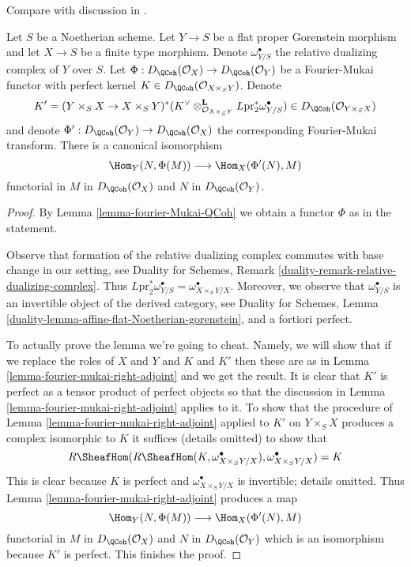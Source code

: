 \begin{lemma}
\label{lemma-fourier-mukai-left-adjoint}
\begin{reference}
Compare with discussion in \cite{Rizzardo}.
\end{reference}
Let $S$ be a Noetherian scheme. Let $Y \to S$ be a flat proper
Gorenstein morphism and let $X \to S$ be a finite type morphism.
Denote $\omega^\bullet_{Y/S}$ the relative dualizing complex of
$Y$ over $S$. Let $\Phi : D_\QCoh(\mathcal{O}_X) \to D_\QCoh(\mathcal{O}_Y)$
be a Fourier-Mukai functor with perfect kernel
$K \in D_\QCoh(\mathcal{O}_{X \times_S Y})$. Denote
$$
K' = (Y \times_S X \to X \times_S Y)^*(K^\vee
\otimes_{\mathcal{O}_{X \times_S Y}}^\mathbf{L}
L\text{pr}_2^*\omega^\bullet_{Y/S})
\in
D_\QCoh(\mathcal{O}_{Y \times_S X})
$$
and denote $\Phi' : D_\QCoh(\mathcal{O}_Y) \to D_\QCoh(\mathcal{O}_X)$
the corresponding Fourier-Mukai transform. There is a canonical
isomorphism
$$
\Hom_Y(N, \Phi(M)) \longrightarrow \Hom_X(\Phi'(N), M)
$$
functorial in $M$ in $D_\QCoh(\mathcal{O}_X)$ and $N$ in
$D_\QCoh(\mathcal{O}_Y)$.
\end{lemma}

\begin{proof}
By Lemma \ref{lemma-fourier-Mukai-QCoh} we obtain a functor $\Phi$
as in the statement.

\medskip\noindent
Observe that formation of the relative dualizing complex commutes
with base change in our setting, see Duality for Schemes,
Remark \ref{duality-remark-relative-dualizing-complex}.
Thus $L\text{pr}_2^*\omega^\bullet_{Y/S} = \omega^\bullet_{X \times_S Y/X}$.
Moreover, we observe that $\omega^\bullet_{Y/S}$ is an
invertible object of the derived category, see Duality for Schemes, Lemma
\ref{duality-lemma-affine-flat-Noetherian-gorenstein}, and a fortiori
perfect.

\medskip\noindent
To actually prove the lemma we're going to cheat. Namely, we will
show that if we replace the roles of $X$ and $Y$ and $K$ and $K'$
then these are as in Lemma \ref{lemma-fourier-mukai-right-adjoint}
and we get the result. It is clear that $K'$ is perfect as a
tensor product of perfect objects so that the discussion in
Lemma \ref{lemma-fourier-mukai-right-adjoint} applies to it.
To show that the procedure of
Lemma \ref{lemma-fourier-mukai-right-adjoint} applied to $K'$
on $Y \times_S X$ produces a complex isomorphic to $K$ it suffices
(details omitted) to show that
$$
R\SheafHom(R\SheafHom(K, \omega^\bullet_{X \times_S Y/X}),
\omega^\bullet_{X \times_S Y/X}) = K
$$
This is clear because $K$ is perfect and $\omega^\bullet_{X \times_S Y/X}$
is invertible; details omitted. Thus
Lemma \ref{lemma-fourier-mukai-right-adjoint} produces a map
$$
\Hom_Y(N, \Phi(M)) \longrightarrow \Hom_X(\Phi'(N), M)
$$
functorial in $M$ in $D_\QCoh(\mathcal{O}_X)$ and $N$ in
$D_\QCoh(\mathcal{O}_Y)$ which is an isomorphism because
$K'$ is perfect. This finishes the proof.
\end{proof}

